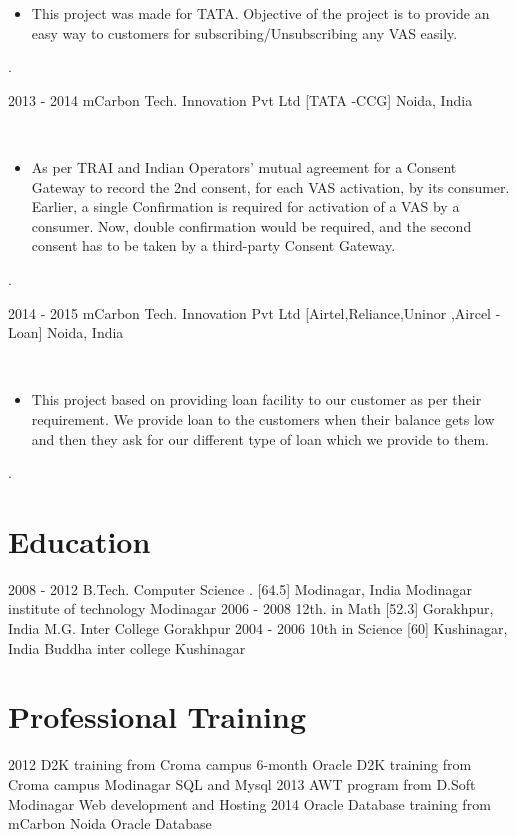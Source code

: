 \documentclass[]{cv-style}
\begin{document}
\begin{entrylist}
{\begin{itemize}
\item  This project was made for TATA. Objective of the project is to provide an easy way to customers for subscribing/Unsubscribing any VAS easily.
\end{itemize}
.\\}
\entry
  {2013 - 2014}
  {mCarbon Tech. Innovation Pvt Ltd [TATA -CCG]}
  {Noida, India}
  {\
\begin{itemize}
\item  As per TRAI and Indian Operators’ mutual agreement for a Consent Gateway to record the 2nd consent, for each VAS activation, by its consumer. Earlier, a single Confirmation is required for activation of a VAS by a consumer. Now, double confirmation would be required, and the second consent has to be taken by a third-party Consent Gateway.
\end{itemize}
.\\}
\entry
  {2014 - 2015}
  {mCarbon Tech. Innovation Pvt Ltd [Airtel,Reliance,Uninor ,Aircel -Loan]}
  {Noida, India}
  {\
\begin{itemize}
\item  This project based on providing loan facility to our customer as per their requirement. We provide loan to the customers   when their balance gets low and then they ask for our different type of loan which we provide to them.
\end{itemize}
.\\}
\end{entrylist}
\section{Education}
\begin{entrylist}
\entry
{2008 - 2012}
{B.Tech. Computer Science {\normalfont . [64.5]}}
{Modinagar, India}
{Modinagar institute of technology Modinagar}
\entry
{2006 - 2008}
{12th. {\normalfont in Math [52.3]}}
{Gorakhpur, India}
{M.G. Inter College Gorakhpur}
\entry
{2004 - 2006}
{10th {\normalfont in Science [60]}}
{Kushinagar, India}
{Buddha inter college Kushinagar}
\end{entrylist} 
\section{Professional Training}
\begin{entrylist}
\entry
{2012}
{D2K training from Croma campus}
{6-month Oracle D2K  training from Croma campus Modinagar}
{SQL and Mysql}
\entry
{2013}
{AWT program from D.Soft}
{Modinagar}
{Web development and Hosting}
\entry
{2014}
{Oracle Database training  from  mCarbon}
{Noida}
{Oracle Database}
\end{entrylist}
\end{document}
